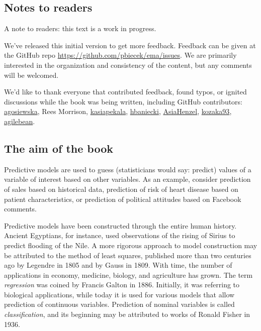 \documentclass[12pt,]{krantz}
\begin{document}
\hypertarget{notes-to-readers}{%
\subsection{Notes to readers}\label{notes-to-readers}}

A note to readers: this text is a work in progress.

We've released this initial version to get more feedback. Feedback can be given at the GitHub repo \url{https://github.com/pbiecek/ema/issues}. We are primarily interested in the organization and consistency of the content, but any comments will be welcomed.

We'd like to thank everyone that contributed feedback, found typos, or ignited discussions while the book was being written, including GitHub contributors: \href{https://github.com/agosiewska/}{agosiewska}, Rees Morrison, \href{https://github.com/kasiapekala/}{kasiapekala}, \href{https://github.com/hbaniecki/}{hbaniecki}, \href{https://github.com/AsiaHenzel/}{AsiaHenzel}, \href{https://github.com/kozaka93/}{kozaka93},
\href{https://github.com/agilebean/}{agilebean}.

\hypertarget{the-aim-of-the-book}{%
\subsection{The aim of the book}\label{the-aim-of-the-book}}

Predictive models are used to guess (statisticians would say: predict) values of a variable of interest based on other variables. As an example, consider prediction of sales based on historical data, prediction of risk of heart disease based on patient characteristics, or prediction of political attitudes based on Facebook comments.

Predictive models have been constructed through the entire human history. Ancient Egyptians, for instance, used observations of the rising of Sirius to predict flooding of the Nile. A more rigorous approach to model construction may be attributed to the method of least squares, published more than two centuries ago by Legendre in 1805 and by Gauss in 1809. With time, the number of applications in economy, medicine, biology, and agriculture has grown. The term \emph{regression} was coined by Francis Galton in 1886. Initially, it was referring to biological applications, while today it is used for various models that allow prediction of continuous variables. Prediction of nominal variables is called \emph{classification}, and its beginning may be attributed to works of Ronald Fisher in 1936.
\end{document}
